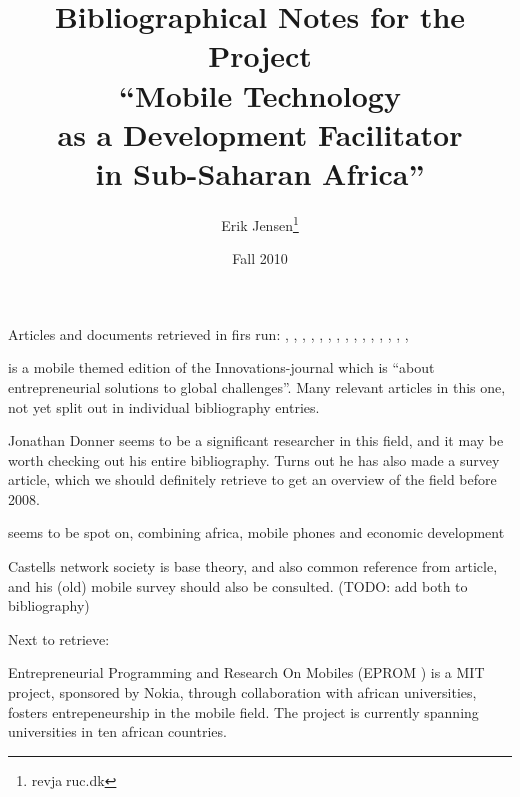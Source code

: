 \documentclass[11pt]{article}
\title{
Bibliographical Notes for the Project\\ ``Mobile Technology \\ as a Development Facilitator \\ in Sub-Saharan Africa''
}
\author{
Erik Jensen\footnote{ revj\textcircled{a}ruc.dk }
}
\date{Fall 2010}
\begin{document}
\maketitle


Articles and documents retrieved in firs run: \cite{aker2010}, \cite{bhavnani2008}, \cite{brown2008}, \cite{carmody2009}, \cite{donner2005}, \cite{donner2009}, \cite{edigheji2007}, \cite{ford2010}, \cite{gsma2009}, \cite{james2007}, \cite{kreutzer2009}, \cite{muto2008}, \cite{pfaff2010}, \cite{rashid2009}, \cite{tella2009}, \cite{zeeb2009}

\cite{gsma2009} is a mobile themed edition of the Innovations-journal which is ``about entrepreneurial solutions to global challenges''. Many relevant articles in this one, not yet split out in individual bibliography entries.

Jonathan Donner\cite{donner2005,donner2009} seems to be a significant researcher in this field, and it may be worth checking out his entire bibliography. Turns out he has also made a survey article\cite{donner2008}, which we should definitely retrieve to get an overview of the field before 2008.

\cite{aker2010} seems to be spot on, combining africa, mobile phones and economic development

Castells network society is base theory, and also common reference from article, and his (old) mobile survey should also be consulted. (TODO: add both to bibliography)


Next to retrieve: \cite{harlow2010}\cite{duncombe2009}\cite{buys2009}\cite{kaba2009}\cite{bailard2009}\cite{donner2009}\cite{donner2004}

%
%
%

Entrepreneurial Programming and Research On Mobiles (EPROM \cite{EPROM}) is a MIT project, sponsored by Nokia, through collaboration with african universities, fosters entrepeneurship in the mobile field. 
The project is currently spanning universities in ten african countries.



\appendix





\end{document}
